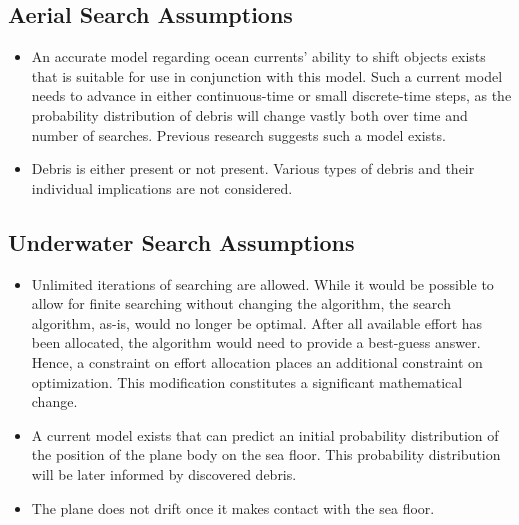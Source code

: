 \subsection{Aerial Search Assumptions}

\begin{itemize}
\item An accurate model regarding ocean currents' ability to shift objects exists that is suitable for use in conjunction with this model. Such a current model needs to advance in either continuous-time or small discrete-time steps, as the probability distribution of debris will change vastly both over time and number of searches. Previous research suggests such a model exists. 
\item Debris is either present or not present. Various types of debris and their individual implications are not considered. 
\end{itemize}

\subsection{Underwater Search Assumptions}

\begin{itemize}
\item Unlimited iterations of searching are allowed. While it would be possible to allow for finite searching without changing the algorithm, the search algorithm, as-is, would no longer be optimal. 
After all available effort has been allocated, the algorithm would need to provide a best-guess answer. Hence, a constraint on effort allocation places an additional constraint on optimization.  This modification constitutes a significant mathematical change.
\item A current model exists that can predict an initial probability distribution of the position of the plane body on the sea floor. This probability distribution will be later informed by discovered debris.
\item The plane does not drift once it makes contact with the sea floor.   
\end{itemize}